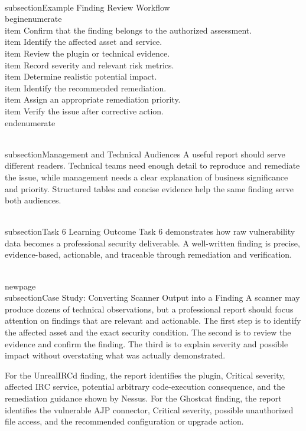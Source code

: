 \documentclass[11pt,a4paper]{article}
\begin{document}
\\subsection{Example Finding Review Workflow}
\\begin{enumerate}
\\item Confirm that the finding belongs to the authorized assessment.
\\item Identify the affected asset and service.
\\item Review the plugin or technical evidence.
\\item Record severity and relevant risk metrics.
\\item Determine realistic potential impact.
\\item Identify the recommended remediation.
\\item Assign an appropriate remediation priority.
\\item Verify the issue after corrective action.
\\end{enumerate}

\\subsection{Management and Technical Audiences}
A useful report should serve different readers. Technical teams need enough detail to reproduce and remediate the issue, while management needs a clear explanation of business significance and priority. Structured tables and concise evidence help the same finding serve both audiences.

\\subsection{Task 6 Learning Outcome}
Task 6 demonstrates how raw vulnerability data becomes a professional security deliverable. A well-written finding is precise, evidence-based, actionable, and traceable through remediation and verification.

\\newpage
\\subsection{Case Study: Converting Scanner Output into a Finding}
A scanner may produce dozens of technical observations, but a professional report should focus attention on findings that are relevant and actionable. The first step is to identify the affected asset and the exact security condition. The second is to review the evidence and confirm the finding. The third is to explain severity and possible impact without overstating what was actually demonstrated.

For the UnrealIRCd finding, the report identifies the plugin, Critical severity, affected IRC service, potential arbitrary code-execution consequence, and the remediation guidance shown by Nessus. For the Ghostcat finding, the report identifies the vulnerable AJP connector, Critical severity, possible unauthorized file access, and the recommended configuration or upgrade action.
\end{document}
